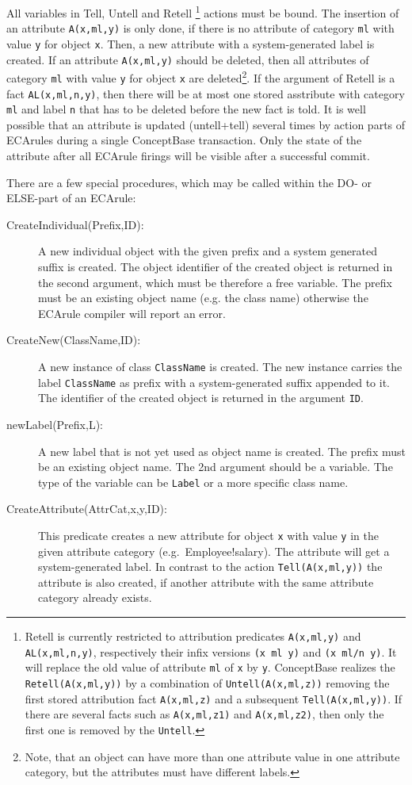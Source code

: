 All variables in Tell, Untell and Retell%
\footnote{Retell is currently restricted to attribution predicates {\tt A(x,ml,y)} and {\tt AL(x,ml,n,y)},
respectively their infix versions {\tt (x ml y)} and {\tt (x ml/n y)}.
It will replace the old value of attribute {\tt ml} of  {\tt x} by  {\tt y}.
ConceptBase realizes the {\tt Retell(A(x,ml,y))} by a combination of {\tt Untell(A(x,ml,z))}
 removing the first stored attribution fact {\tt A(x,ml,z)}
 and a subsequent {\tt Tell(A(x,ml,y))}. If there are several facts such as
{\tt A(x,ml,z1)} and {\tt A(x,ml,z2)}, then only the first one is removed by the {\tt Untell}.}
actions must be bound. The insertion of an attribute {\tt A(x,ml,y)} is only done,
if there is no attribute of category {\tt ml} with value {\tt y} for object {\tt x}.
Then, a new attribute with a system-generated
label is created. If an attribute {\tt A(x,ml,y)} should be deleted, then all attributes
of category {\tt ml} with value {\tt y} for object {\tt x} are deleted\footnote{Note, that
an object can have more than one attribute value in one attribute category, but the attributes
must have different labels.}.
If the argument of Retell is a fact {\tt AL(x,ml,n,y)}, then there will be at most one stored
asstribute with category {\tt ml} and label {\tt n} that has to be deleted before the new fact is told.
It is well possible that an attribute is updated (untell+tell) several times by action parts
of ECArules during a single ConceptBase transaction. Only the state of the attribute
after all ECArule firings will be visible after a successful commit.




There are a few special procedures, which may be called within the DO- or ELSE-part of an ECArule:

\begin{description}
\item[CreateIndividual(Prefix,ID):] A new individual object with the given
prefix and a system generated suffix is created. The object identifier of
the created object is returned in the second argument, which must be therefore
a free variable. The prefix must be an existing object name (e.g. the class name)
otherwise the ECArule compiler will report an error. 
\item[CreateNew(ClassName,ID):] A new instance of class {\tt ClassName} is created. 
The new instance carries the label {\tt ClassName} as prefix with a system-generated
suffix appended to it. The identifier of the created object is returned in the argument {\tt ID}.
\item[newLabel(Prefix,L):] A new label that is not yet used as object name
is created. The prefix must be an existing object name. The 2nd argument
should be a variable. The type of the variable can be {\tt Label} or
a more specific class name.
\item[CreateAttribute(AttrCat,x,y,ID):] This predicate creates a new attribute
for object {\tt x} with value {\tt y} in the given attribute category (e.g.\ Employee!salary).
The attribute will get a system-generated label. In contrast to the action
{\tt Tell(A(x,ml,y))} the attribute is also created, if another attribute with the same
attribute category already exists.
\end{description}

